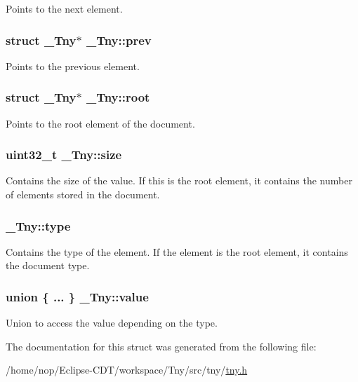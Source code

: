 \-Points to the next element. \hypertarget{struct__Tny_a8d5f8f0948bf771c7cafa595e8573674}{
\subsubsection[{prev}]{\setlength{\rightskip}{0pt plus 5cm}struct {\bf \-\_\-\-Tny}$\ast$ {\bf \-\_\-\-Tny\-::prev}}}\label{struct__Tny_a8d5f8f0948bf771c7cafa595e8573674}
\-Points to the previous element. \hypertarget{struct__Tny_acb94256d861006db4e789a8a8733a48c}{
\subsubsection[{root}]{\setlength{\rightskip}{0pt plus 5cm}struct {\bf \-\_\-\-Tny}$\ast$ {\bf \-\_\-\-Tny\-::root}}}\label{struct__Tny_acb94256d861006db4e789a8a8733a48c}
\-Points to the root element of the document. \hypertarget{struct__Tny_a3e01f2bff5e3d773b3a09d00a229498f}{
\subsubsection[{size}]{\setlength{\rightskip}{0pt plus 5cm}uint32\-\_\-t {\bf \-\_\-\-Tny\-::size}}}\label{struct__Tny_a3e01f2bff5e3d773b3a09d00a229498f}
\-Contains the size of the value. \-If this is the root element, it contains the number of elements stored in the document. \hypertarget{struct__Tny_aecebe7f325021541ee357eb7ca5f2de7}{
\subsubsection[{type}]{ {\bf \-\_\-\-Tny\-::type}}}\label{struct__Tny_aecebe7f325021541ee357eb7ca5f2de7}
\-Contains the type of the element. \-If the element is the root element, it contains the document type. \hypertarget{struct__Tny_a832c5c7cfd9f65289a589dd97bbd02f6}{
\subsubsection[{value}]{\setlength{\rightskip}{0pt plus 5cm}union \{ ... \}   {\bf \-\_\-\-Tny\-::value}}}\label{struct__Tny_a832c5c7cfd9f65289a589dd97bbd02f6}
\-Union to access the value depending on the type. 

\-The documentation for this struct was generated from the following file\-:\begin{DoxyCompactItemize}
\item 
/home/nop/\-Eclipse-\/\-C\-D\-T/workspace/\-Tny/src/tny/\hyperlink{tny_8h}{tny.\-h}\end{DoxyCompactItemize}
